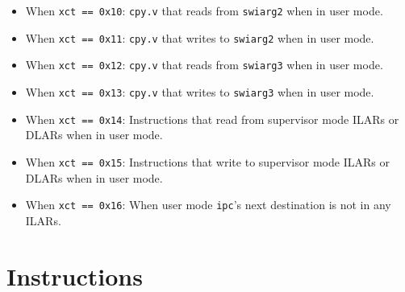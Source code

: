 \documentclass{article}
\begin{document}
\begin{itemize}
	\item When \texttt{xct == 0x10}:
		\texttt{cpy.v} that reads from \texttt{swiarg2} when in user mode.
	\item When \texttt{xct == 0x11}:
		\texttt{cpy.v} that writes to \texttt{swiarg2} when in user mode.
	\item When \texttt{xct == 0x12}:
		\texttt{cpy.v} that reads from \texttt{swiarg3} when in user mode.
	\item When \texttt{xct == 0x13}:
		\texttt{cpy.v} that writes to \texttt{swiarg3} when in user mode.

	\item When \texttt{xct == 0x14}:
		Instructions that read from supervisor mode ILARs or DLARs when in
		user mode.
	\item When \texttt{xct == 0x15}:
		Instructions that write to supervisor mode ILARs or DLARs when in
		user mode.
	\item When \texttt{xct == 0x16}:
		When user mode \texttt{ipc}'s next destination is not in any ILARs.
	\end{itemize}
	\newpage
\section{Instructions}
\end{document}
